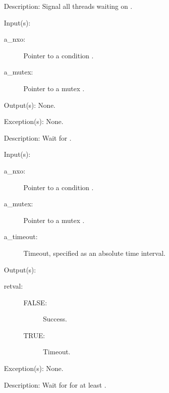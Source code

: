\begin{capi}
\begin{capilist}
	\item[Description: ]
		Signal all threads waiting on .
	\end{capilist}
\label{nxo_condition_wait}
	\begin{capilist}
	\item[Input(s): ]
		\begin{description}\item[]
		\item[a\_nxo: ]
			Pointer to a condition .
		\item[a\_mutex: ]
			Pointer to a mutex .
		\end{description}
	\item[Output(s): ] None.
	\item[Exception(s): ] None.
	\item[Description: ]
		Wait for .
	\end{capilist}
\label{nxo_condition_timedwait}
	\begin{capilist}
	\item[Input(s): ]
		\begin{description}\item[]
		\item[a\_nxo: ]
			Pointer to a condition \classname{nxo}.
		\item[a\_mutex: ]
			Pointer to a mutex \classname{nxo}.
		\item[a\_timeout: ]
			Timeout, specified as an absolute time interval.
		\end{description}
	\item[Output(s): ]
		\begin{description}\item[]
		\item[retval: ]
			\begin{description}\item[]
			\item[FALSE: ] Success.
			\item[TRUE: ] Timeout.
			\end{description}
		\end{description}
	\item[Exception(s): ] None.
	\item[Description: ]
		Wait for  for at least \cvar{a\_timeout}.
	\end{capilist}
\end{capi}
